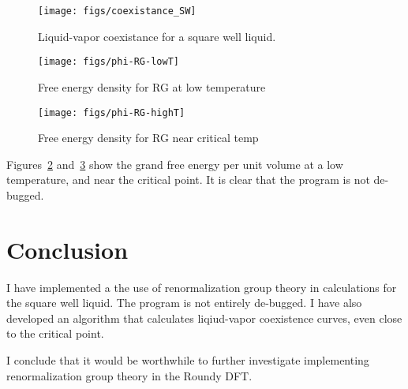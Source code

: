 \documentclass[letterpaper,twocolumn,amsmath,amssymb,prb]{revtex4-1}
\newcommand{\1}{\ensuremath{\textbf{r}_1}}
\newcommand{\2}{\ensuremath{\textbf{r}_2}}
\newcommand{\3}{\ensuremath{\textbf{r}_3}}
\newcommand{\4}{\ensuremath{\textbf{r}_4}}
\begin{document}
\begin{figure}
  \begin{center}
  \texttt{[image: figs/coexistance\_SW]}
  \end{center}
  \caption{Liquid-vapor coexistance for a square well liquid.}
  \label{fig:coexistance_SW}
\end{figure}

\begin{figure}
  \begin{center}
  \texttt{[image: figs/phi-RG-lowT]}
  \end{center}
  \caption{Free energy density for RG at low temperature}
  \label{fig:phi-RG-lowT}
\end{figure}

\begin{figure}
  \begin{center}
  \texttt{[image: figs/phi-RG-highT]}
  \end{center}
  \caption{Free energy density for RG near critical temp}
  \label{fig:phi-RG-highT}
\end{figure}

Figures~\ref{fig:phi-RG-lowT} and~\ref{fig:phi-RG-highT} show the
grand free energy per unit volume at a low temperature, and near the
critical point. It is clear that the program is not de-bugged.


\section{Conclusion}\label{sec:conclusion}

I have implemented a the use of renormalization group theory in
calculations for the square well liquid. The program is not entirely
de-bugged. I have also developed an algorithm that calculates
liqiud-vapor coexistence curves, even close to the critical point.

I conclude that it would be worthwhile to further investigate implementing renormalization group theory in the Roundy DFT.



\end{document}
